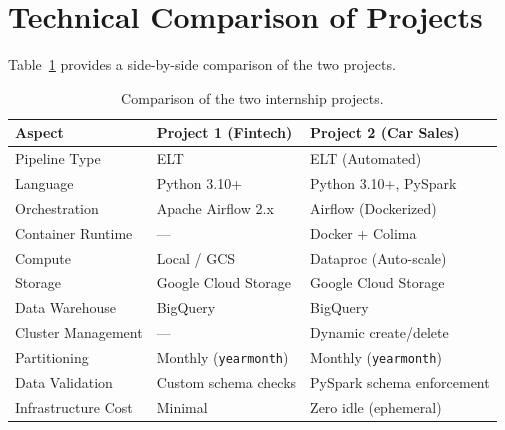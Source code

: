 \documentclass[12pt, a4paper]{article}
\begin{document}
\section{Technical Comparison of Projects}
\label{sec:tech}

\noindent Table~\ref{table:project_comparison} provides a side-by-side comparison of the two projects.

\begin{table}[h!]
    \centering
    \caption{Comparison of the two internship projects.}
    \begin{tabular}{lll}
        \toprule
        \textbf{Aspect} & \textbf{Project 1 (Fintech)} & \textbf{Project 2 (Car Sales)} \\
        \midrule
        Pipeline Type       & ELT                        & ELT (Automated)             \\
        Language            & Python 3.10+               & Python 3.10+, PySpark       \\
        Orchestration       & Apache Airflow 2.x         & Airflow (Dockerized)        \\
        Container Runtime   & ---                        & Docker + Colima             \\
        Compute             & Local / GCS                & Dataproc (Auto-scale)       \\
        Storage             & Google Cloud Storage        & Google Cloud Storage        \\
        Data Warehouse      & BigQuery                   & BigQuery                    \\
        Cluster Management  & ---                        & Dynamic create/delete       \\
        Partitioning        & Monthly (\texttt{yearmonth}) & Monthly (\texttt{yearmonth}) \\
        Data Validation     & Custom schema checks       & PySpark schema enforcement  \\
        Infrastructure Cost & Minimal                    & Zero idle (ephemeral)       \\
        \bottomrule
    \end{tabular}
    \label{table:project_comparison}
\end{table}

\end{document}
